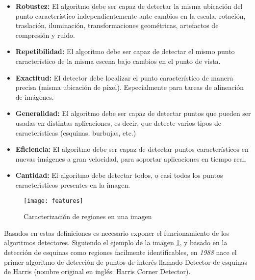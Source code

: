 \begin{itemize}
	\item \textbf{Robustez:} El algoritmo debe ser capaz de detectar la misma ubicación del punto característico independientemente ante cambios en la escala, rotación, traslación, iluminación, transformaciones geométricas, artefactos de compresión y ruido.
	
	\item \textbf{Repetibilidad:} El algoritmo debe ser capaz de detectar el mismo punto característico de la misma escena bajo cambios en el punto de vista.
	
	\item \textbf{Exactitud:} El detector debe localizar el punto característico de manera precisa (misma ubicación de píxel). Especialmente para tareas de alineación de imágenes.
	
	\item \textbf{Generalidad:} El algoritmo debe ser capaz de detectar puntos que pueden ser usadas en distintas aplicaciones, es decir, que detecte varios tipos de características (esquinas, burbujas, etc.)
	
	\item \textbf{Eficiencia:} El algoritmo debe ser capaz de detectar puntos característicos en nuevas imágenes a gran velocidad, para soportar aplicaciones en tiempo real.
	
	\item \textbf{Cantidad:} El algoritmo debe detectar todos, o casi todos los puntos característicos presentes en la imagen. 
	
\end{itemize}



\begin{figure}[H]
	\centering
	\texttt{[image: features]}
	\caption[Caracterización de regiones en una imagen]{Caracterización de regiones en una imagen\protect\footnotemark}
	\label{imagen:features}
\end{figure}

Basados en estas definiciones es necesario exponer el funcionamiento de los algoritmos detectores.  Siguiendo el ejemplo de la imagen \ref{imagen:features}, y basado en la detección de esquinas como regiones facilmente identificables,  en \textit{1988} nace el primer algoritmo de detección de puntos de interés llamado Detector de esquinas de Harris \cite{harris} (nombre original en inglés: Harris Corner Detector).

